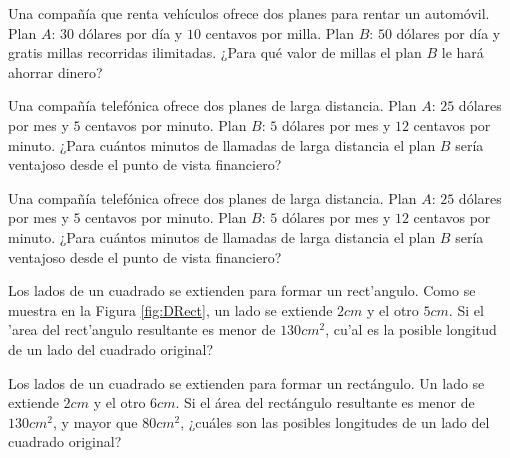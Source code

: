 \documentclass[]{book}
\theoremstyle{definition}
\theoremstyle{definition}
\theoremstyle{definition}
\theoremstyle{remark}
\begin{document}
Una compañía que renta vehículos ofrece dos planes para rentar un automóvil. Plan \(A\): \(30\) dólares por día y \(10\) centavos por milla. Plan \(B\): \(50\) dólares por día y gratis millas recorridas ilimitadas. ¿Para qué valor de millas el plan \(B\) le hará ahorrar dinero?

Una compañía telefónica ofrece dos planes de larga distancia. Plan \(A\): \(25\) dólares por mes y \(5\) centavos por minuto. Plan \(B\): \(5\) dólares por mes y \(12\) centavos por minuto. ¿Para cuántos minutos de llamadas de larga distancia el plan \(B\) sería ventajoso desde el punto de vista financiero?

Una compañía telefónica ofrece dos planes de larga distancia. Plan \(A\): \(25\) dólares por mes y \(5\) centavos por minuto. Plan \(B\): \(5\) dólares por mes y \(12\) centavos por minuto. ¿Para cuántos minutos de llamadas de larga distancia el plan \(B\) sería ventajoso desde el punto de vista financiero?

Los lados de un cuadrado se extienden para formar un rect'angulo. Como se muestra en la Figura \ref{fig:DRect}, un lado se extiende \(2 cm\) y el otro \(5 cm\). Si el 'area del rect'angulo resultante es menor de \(130 cm^2\), cu'al es la posible longitud de un lado del cuadrado original?

Los lados de un cuadrado se extienden para formar un rectángulo. Un lado se extiende \(2 cm\) y el otro \(6 cm\). Si el área del rectángulo resultante es menor de \(130 cm^2\), y mayor que \(80 cm^2\), ¿cuáles son las posibles longitudes de un lado del cuadrado original?


\end{document}
